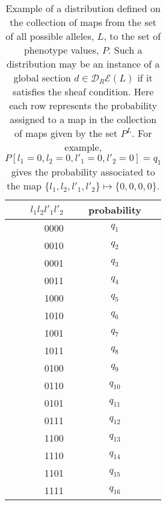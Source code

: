 \begin{table}[!ht]
\centering
\begin{tabular}{ r || c }
$l_1 l_2 l'_1 l'_2$ & probability \\ \hline
0000 & $q_1$ \\
0010 & $q_2$ \\
0001 & $q_3$ \\
0011 & $q_4$ \\
1000 & $q_5$ \\
1010 & $q_6$ \\
1001 & $q_7$ \\
1011 & $q_8$ \\
0100 & $q_9$ \\
0110 & $q_{10}$ \\
0101 & $q_{11}$ \\
0111 & $q_{12}$ \\
1100 & $q_{13}$ \\
1110 & $q_{14}$ \\
1101 & $q_{15}$ \\
1111 & $q_{16}$
\end{tabular}
\caption{Example of a distribution defined on the collection of maps from the set of all possible alleles, $L$, to the set of phenotype values, $P$. Such a distribution may be an instance of a global section $d \in \mathcal{D}_R\mathcal{E}(L)$ if it satisfies the sheaf condition.  Here each row represents the probability assigned to a map in the collection of maps given by the set $P^L$. For example, $P[l_1=0,l_2=0,l'_1=0,l'_2=0]=q_1$ gives the probability associated to the map $\{l_1, l_2, l'_1, l'_2\} \mapsto \{0,0,0,0\}$.}
\label{tab:hidvarmod}
\end{table}
